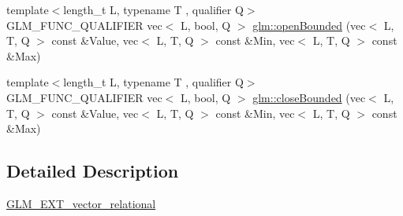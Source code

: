 \begin{DoxyCompactItemize}
\item 
{\footnotesize template$<$length\+\_\+t L, typename T , qualifier Q$>$ }\\G\+L\+M\+\_\+\+F\+U\+N\+C\+\_\+\+Q\+U\+A\+L\+I\+F\+I\+ER vec$<$ L, bool, Q $>$ \hyperlink{group__ext__vector__relational_gafd303042ba2ba695bf53b2315f53f93f}{glm\+::open\+Bounded} (vec$<$ L, T, Q $>$ const \&Value, vec$<$ L, T, Q $>$ const \&Min, vec$<$ L, T, Q $>$ const \&Max)
\item 
{\footnotesize template$<$length\+\_\+t L, typename T , qualifier Q$>$ }\\G\+L\+M\+\_\+\+F\+U\+N\+C\+\_\+\+Q\+U\+A\+L\+I\+F\+I\+ER vec$<$ L, bool, Q $>$ \hyperlink{group__ext__vector__relational_gab7d89c14c48ad01f720fb5daf8813161}{glm\+::close\+Bounded} (vec$<$ L, T, Q $>$ const \&Value, vec$<$ L, T, Q $>$ const \&Min, vec$<$ L, T, Q $>$ const \&Max)
\end{DoxyCompactItemize}


\subsection{Detailed Description}
\hyperlink{group__ext__vector__relational}{G\+L\+M\+\_\+\+E\+X\+T\+\_\+vector\+\_\+relational} 